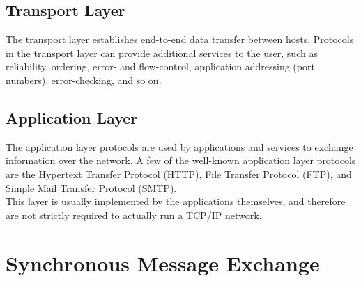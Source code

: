\subsection{Transport Layer}
The transport layer establishes end-to-end data transfer between hosts.
Protocols in the transport layer can provide additional services to the user,
such as reliability, ordering, error- and flow-control, application addressing 
(port numbers), error-checking, and so on. 

\subsection{Application Layer}
The application layer protocols are used by applications and services to 
exchange information over the network. A few of the well-known application
layer protocols are the Hypertext Transfer Protocol (HTTP)\cite{RFC1945},
File Transfer Protocol (FTP)\cite{RFC0114}, and Simple Mail Transfer Protocol
(SMTP)\cite{RFC0788}.\\
This layer is usually implemented by the applications themselves, and therefore 
are not strictly required to actually run a TCP/IP network.





\section{Synchronous Message Exchange}

